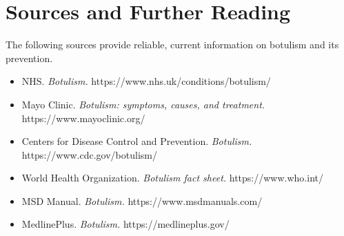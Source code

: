 \section*{Sources and Further Reading}
The following sources provide reliable, current information on botulism and its prevention.
\begin{itemize}
    \item NHS. \textit{Botulism.} https://www.nhs.uk/conditions/botulism/
    \item Mayo Clinic. \textit{Botulism: symptoms, causes, and treatment.} https://www.mayoclinic.org/
    \item Centers for Disease Control and Prevention. \textit{Botulism.} https://www.cdc.gov/botulism/
    \item World Health Organization. \textit{Botulism fact sheet.} https://www.who.int/
    \item MSD Manual. \textit{Botulism.} https://www.msdmanuals.com/
    \item MedlinePlus. \textit{Botulism.} https://medlineplus.gov/
\end{itemize}
